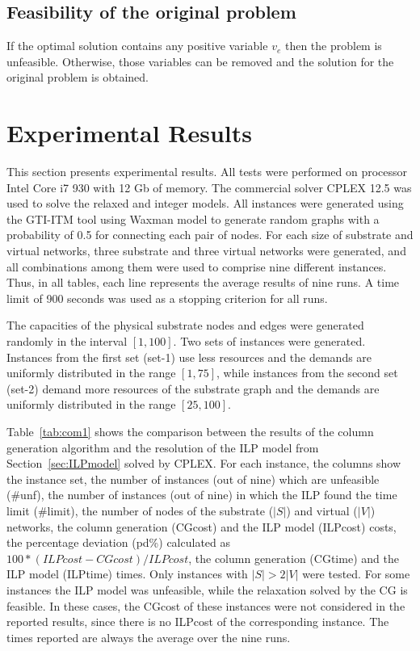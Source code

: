 \documentclass[article]{llncs}
\begin{document}
\subsection{Feasibility of the original problem}
If the optimal solution contains any positive variable $v_{e}$ then the problem is unfeasible.
Otherwise, those variables can be removed and the solution for the original problem is obtained.

\section{Experimental Results}
\label{sec:results}
This section presents experimental results. All tests were performed on processor Intel Core i7 930 with 12 Gb of memory. 
The commercial solver CPLEX 12.5 was used to solve the relaxed and integer models. 
All instances were generated using the GTI-ITM tool \cite{Zagura:96} using Waxman model to generate random graphs with a probability of 0.5 for connecting each pair of nodes.
For each size of substrate and virtual networks, three substrate and three virtual networks were generated, and all combinations among them were used to comprise nine different instances. Thus, in all tables, each line represents the average results of nine runs. A time limit of 900 seconds was used as a stopping criterion for all runs.

The capacities of the physical substrate nodes and edges were generated randomly in the interval $[1,100]$.
Two sets of instances were generated. Instances from the first set (set-1) use less resources and the demands are uniformly distributed in the range $[1,75]$, while instances from the second set (set-2) demand more resources of the substrate graph and the demands are uniformly distributed in the range $[25,100]$.

Table~\ref{tab:com1} shows the comparison between the results of the column generation algorithm and the resolution of the ILP model from Section~\ref{sec:ILPmodel} solved by CPLEX.
For each instance, the columns show the instance set, the number of instances (out of nine) which are unfeasible (\#unf), the number of instances (out of nine) in which the ILP found the time limit (\#limit), the number of nodes of the substrate ($|S|$) and virtual ($|V|$) networks, the column generation (CGcost) and the ILP model (ILPcost) costs, the percentage deviation (pd\%) calculated as $100*(ILPcost-CGcost)/ILPcost$, the column generation (CGtime) and the ILP model (ILPtime) times. 
Only instances with $|S| > 2|V|$ were tested.
For some instances the ILP model was unfeasible, while the relaxation solved by the CG is feasible. 
In these cases, the CGcost of these instances were not considered in the reported results, since there is no ILPcost of the corresponding instance.
The times reported are always the average over the nine runs.
\end{document}
